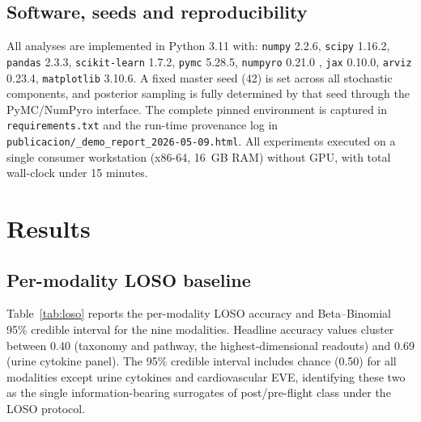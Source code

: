 \documentclass[11pt,a4paper,3p,authoryear]{elsarticle}
\begin{document}
\subsection{Software, seeds and reproducibility}

All analyses are implemented in Python 3.11 with: \texttt{numpy} 2.2.6, \texttt{scipy} 1.16.2, \texttt{pandas} 2.3.3, \texttt{scikit-learn} 1.7.2, \texttt{pymc} 5.28.5, \texttt{numpyro} 0.21.0 \citep{Phan2019numpyro}, \texttt{jax} 0.10.0, \texttt{arviz} 0.23.4, \texttt{matplotlib} 3.10.6. A fixed master seed (42) is set across all stochastic components, and posterior sampling is fully determined by that seed through the PyMC/NumPyro interface. The complete pinned environment is captured in \texttt{requirements.txt} and the run-time provenance log in \texttt{publicacion/\_demo\_report\_2026-05-09.html}. All experiments executed on a single consumer workstation (x86-64, 16~GB RAM) without GPU, with total wall-clock under 15 minutes.

\section{Results}\label{sec:results}

\subsection{Per-modality LOSO baseline}

Table~\ref{tab:loso} reports the per-modality LOSO accuracy and Beta--Binomial 95\% credible interval for the nine modalities. Headline accuracy values cluster between 0.40 (taxonomy and pathway, the highest-dimensional readouts) and 0.69 (urine cytokine panel). The 95\% credible interval includes chance (0.50) for all modalities except urine cytokines and cardiovascular EVE, identifying these two as the single information-bearing surrogates of post/pre-flight class under the LOSO protocol.
\end{document}
